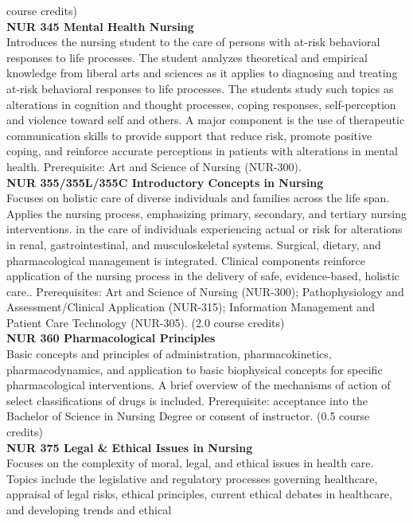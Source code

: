 \documentclass[
  letterpaper,
]{scrbook}
\begin{document}
course credits)\\
\textbf{NUR 345 Mental Health Nursing}\\
Introduces the nursing student to the care of persons with at-risk
behavioral responses to life processes. The student analyzes theoretical
and empirical knowledge from liberal arts and sciences as it applies to
diagnosing and treating at-risk behavioral responses to life processes.
The students study such topics as alterations in cognition and thought
processes, coping responses, self-perception and violence toward self
and others. A major component is the use of therapeutic communication
skills to provide support that reduce risk, promote positive coping, and
reinforce accurate perceptions in patients with alterations in mental
health. Prerequisite: Art and Science of Nursing (NUR-300).\\
\textbf{NUR 355/355L/355C Introductory Concepts in Nursing}\\
Focuses on holistic care of diverse individuals and families across the
life span. Applies the nursing process, emphasizing primary, secondary,
and tertiary nursing interventions. in the care of individuals
experiencing actual or risk for alterations in renal, gastrointestinal,
and musculoskeletal systems. Surgical, dietary, and pharmacological
management is integrated. Clinical components reinforce application of
the nursing process in the delivery of safe, evidence-based, holistic
care.. Prerequisites: Art and Science of Nursing (NUR-300);
Pathophysiology and Assessment/Clinical Application (NUR-315);
Information Management and Patient Care Technology (NUR-305). (2.0
course credits)\\
\textbf{NUR 360 Pharmacological Principles}\\
Basic concepts and principles of administration, pharmacokinetics,
pharmacodynamics, and application to basic biophysical concepts for
specific pharmacological interventions. A brief overview of the
mechanisms of action of select classifications of drugs is included.
Prerequisite: acceptance into the Bachelor of Science in Nursing Degree
or consent of instructor. (0.5 course credits)\\
\textbf{NUR 375 Legal \& Ethical Issues in Nursing}\\
Focuses on the complexity of moral, legal, and ethical issues in health
care. Topics include the legislative and regulatory processes governing
healthcare, appraisal of legal risks, ethical principles, current
ethical debates in healthcare, and developing trends and ethical
\end{document}
